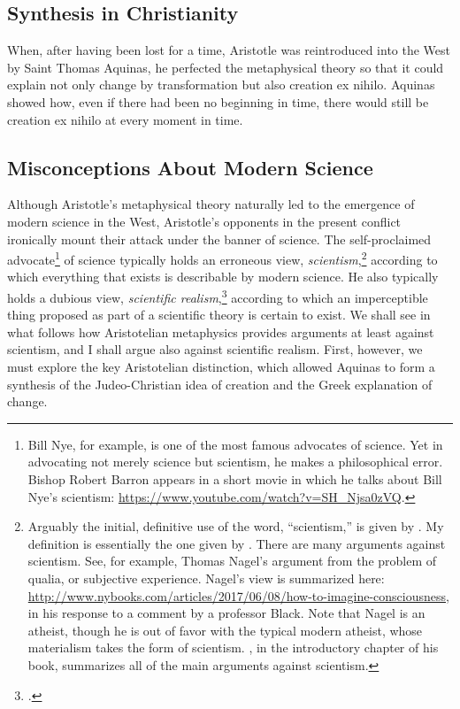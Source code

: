 \documentclass[twocolumn]{article}
\begin{document}
\subsection{Synthesis in Christianity}

When, after having been lost for a time, Aristotle was reintroduced into the
West by Saint Thomas Aquinas, he perfected the metaphysical theory so that it
could explain not only change by transformation but also creation ex nihilo.
Aquinas showed how, even if there had been no beginning in time, there would
still be creation ex nihilo at every moment in time.

\subsection{Misconceptions About Modern Science}

Although Aristotle's metaphysical theory naturally led to the emergence of
modern science in the West, Aristotle's opponents in the present conflict
ironically mount their attack under the banner of science.  The self-proclaimed
advocate\footnote{%
   Bill Nye, for example, is one of the most famous advocates of science.  Yet
   in advocating not merely science but scientism, he makes a philosophical
   error.  Bishop Robert Barron appears in a short movie in which he talks
   about Bill Nye's scientism:
   \url{https://www.youtube.com/watch?v=SH_Njsa0zVQ}.%
}
of science typically holds an erroneous view, \emph{scientism},\footnote{%
   Arguably the initial, definitive use of the word, ``scientism,'' is given by
   \cite{s1991}.  My definition is essentially the one given by \cite{h2011}.
   There are many arguments against scientism.  See, for example, Thomas
   Nagel's argument from the problem of qualia, or subjective experience.
   Nagel's view is summarized here:
   \url{http://www.nybooks.com/articles/2017/06/08/how-to-imagine-consciousness},
   in his response to a comment by a professor Black.  Note that Nagel is an
   atheist, though he is out of favor with the typical modern atheist, whose
   materialism takes the form of scientism.  \cite{f2014}, in the introductory
   chapter of his book, summarizes all of the main arguments against
   scientism.%
}
according to which everything that exists is describable by modern science. He
also typically holds a dubious view, \emph{scientific realism},\footnote{%
   \cite{c2016}.
}
according to which an imperceptible thing proposed as part of a scientific
theory is certain to exist.  We shall see in what follows how Aristotelian
metaphysics provides arguments at least against scientism, and I shall argue
also against scientific realism.  First, however, we must explore the key
Aristotelian distinction, which allowed Aquinas to form a synthesis of the
Judeo-Christian idea of creation and the Greek explanation of change.
\end{document}
